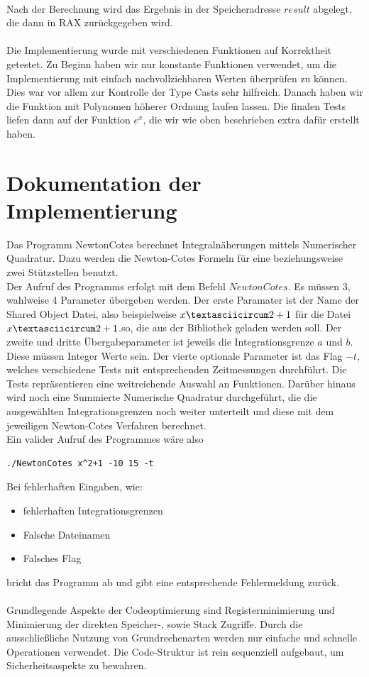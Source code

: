 \documentclass[course=erap]{aspdoc}
\begin{document}
\\
Nach der Berechnung wird das Ergebnis in der Speicheradresse $result$ abgelegt, die dann in RAX zurückgegeben wird.\\
\\
Die Implementierung wurde mit verschiedenen Funktionen auf Korrektheit getestet. Zu Beginn haben wir nur konstante Funktionen verwendet, um die Implementierung mit einfach nachvollziehbaren Werten überprüfen zu können. 
Dies war vor allem zur Kontrolle der Type Casts sehr hilfreich. Danach haben wir die Funktion mit Polynomen höherer Ordnung laufen lassen. Die finalen Tests liefen dann auf der Funktion $e^x$, die wir wie oben beschrieben extra dafür erstellt haben.

\section{Dokumentation der Implementierung}
Das Programm NewtonCotes berechnet Integralnäherungen mittels Numerischer Quadratur. Dazu werden die Newton-Cotes Formeln für eine beziehungsweise zwei Stützstellen benutzt.\\
Der Aufruf des Programms erfolgt mit dem Befehl $NewtonCotes$. 
Es müssen 3, wahlweise 4 Parameter übergeben werden.
Der erste Paramater ist der Name der Shared Object Datei, also beispielweise $x\textasciicircum2+1$ für die Datei $x\textasciicircum2+1$.so, die aus der Bibliothek geladen werden soll. Der zweite und dritte Übergabeparameter ist jeweils die Integrationsgrenze $a$ und $b$. Diese müssen Integer Werte sein. 
Der vierte optionale Parameter ist das Flag $-t$, welches verschiedene Tests mit entsprechenden Zeitmessungen durchführt. Die Tests repräsentieren eine weitreichende Auswahl an Funktionen. Darüber hinaus wird noch eine Summierte Numerische Quadratur durchgeführt, die die ausgewählten Integrationsgrenzen noch weiter unterteilt und diese mit dem jeweiligen Newton-Cotes Verfahren berechnet.\\
Ein valider Aufruf des Programmes wäre also 
\begin{lstlisting}[frame=single]
./NewtonCotes x^2+1 -10 15 -t
\end{lstlisting}
Bei fehlerhaften Eingaben, wie:
\begin{itemize}
\item fehlerhaften Integrationsgrenzen
\item Falsche Dateinamen
\item Falsches Flag
\end{itemize}
bricht das Programm ab und gibt eine entsprechende Fehlermeldung zurück.\\ 
\\
Grundlegende Aspekte der Codeoptimierung sind Registerminimierung und Minimierung der direkten Speicher-, sowie Stack Zugriffe. Durch die ausschließliche Nutzung von Grundrechenarten werden nur einfache und schnelle Operationen verwendet.
Die Code-Struktur ist rein sequenziell aufgebaut, um Sicherheitsaspekte zu bewahren.
\end{document}
